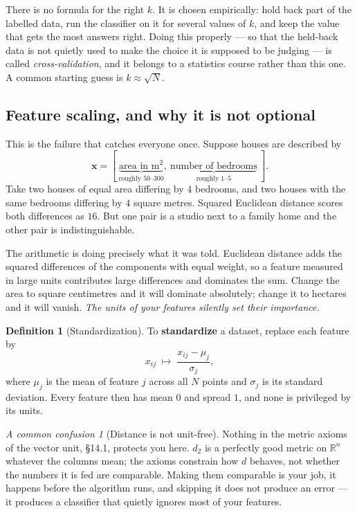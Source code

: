 \documentclass[11pt]{article}
\theoremstyle{plain}
\theoremstyle{definition}
\newtheorem{defn}{Definition}[section]
\theoremstyle{remark}
\newtheorem*{warn}{A common confusion}
\newcommand{\R}{\mathbb{R}}
\newcommand{\vc}[1]{\mathbf{#1}}
\begin{document}
\noindent There is no formula for the right $k$. It is chosen empirically: hold
back part of the labelled data, run the classifier on it for several values of
$k$, and keep the value that gets the most answers right. Doing this properly
--- so that the held-back data is not quietly used to make the choice it is
supposed to be judging --- is called \emph{cross-validation}, and it belongs to
a statistics course rather than this one. A common starting guess is
$k\approx\sqrt{N}$.

\subsection{Feature scaling, and why it is not optional}
This is the failure that catches everyone once. Suppose houses are described by
\[
  \vc{x} = [\ \underbrace{\text{area in m}^{2}}_{\text{roughly }50\text{--}300},
             \ \underbrace{\text{number of bedrooms}}_{\text{roughly }1\text{--}5}\ ] .
\]
Take two houses of equal area differing by $4$ bedrooms, and two houses with the
same bedrooms differing by $4$ square metres. Squared Euclidean distance scores
both differences as $16$. But one pair is a studio next to a family home and the
other pair is indistinguishable.

The arithmetic is doing precisely what it was told. Euclidean distance adds the
squared differences of the components with equal weight, so a feature measured
in large units contributes large differences and dominates the sum. Change the
area to square centimetres and it will dominate absolutely; change it to
hectares and it will vanish. \emph{The units of your features silently set their
importance.}

\begin{defn}[Standardization]
To \textbf{standardize} a dataset, replace each feature by
\[
  x_{ij} \;\longmapsto\; \frac{x_{ij}-\mu_j}{\sigma_j} ,
\]
where $\mu_j$ is the mean of feature $j$ across all $N$ points and $\sigma_j$ is
its standard deviation. Every feature then has mean $0$ and spread $1$, and none
is privileged by its units.
\end{defn}

\begin{warn}[Distance is not unit-free]
Nothing in the metric axioms of the vector unit, \S14.1, protects you here.
$d_2$ is a perfectly good metric on $\R^{n}$ whatever the columns mean; the
axioms constrain how $d$ behaves, not whether the numbers it is fed are
comparable. Making them comparable is your job, it happens before the algorithm
runs, and skipping it does not produce an error --- it produces a classifier
that quietly ignores most of your features.
\end{warn}
\end{document}
